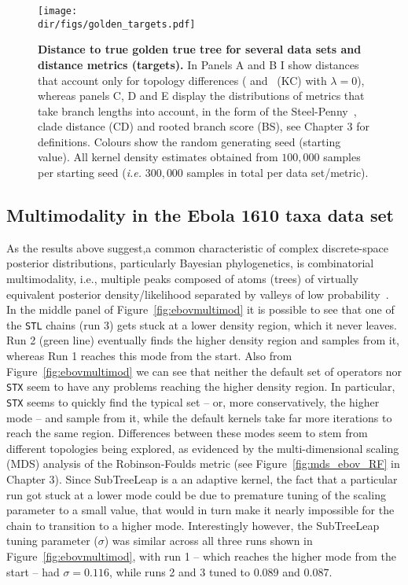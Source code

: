 \begin{figure}[!ht]
\begin{center}
\texttt{[image: \\dir/figs/golden\_targets.pdf]} 
\end{center}
 \caption[Distance to true golden true tree for several data sets and distance metrics (targets).]{\textbf{Distance to true golden true tree for several data sets and distance metrics (targets).}
 In Panels A and B I show distances that account only for topology differences (\cite{Robinson1981} and~\cite{Kendall2016} (KC) with $\lambda = 0$), whereas panels C, D and E display the distributions of metrics that take branch lengths into account, in the form of the Steel-Penny~\citep{Steel1993}, clade distance (CD) and rooted branch score (BS), see Chapter 3 for definitions.
 Colours show the random generating seed (starting value).
 All kernel density estimates obtained from $100, 000$ samples per starting seed (\textit{i.e.} $300, 000$ samples in total per data set/metric).
 }
 \label{fig:target_golden}
\end{figure}

\subsection{Multimodality in the Ebola 1610 taxa data set}
\label{sec:multimod}

As the results above suggest,a common characteristic of complex discrete-space posterior distributions, particularly Bayesian phylogenetics, is combinatorial multimodality, i.e., multiple peaks composed of atoms (trees) of virtually equivalent posterior density/likelihood separated by valleys of low probability~\citep{Lakner2008,Whidden2015}.
In the middle panel of Figure~\ref{fig:ebovmultimod} it is possible to see that one of the \verb|STL| chains (run 3) gets stuck at a lower density region, which it never leaves.
Run 2 (green line) eventually finds the higher density region and samples from it, whereas Run 1 reaches this mode from the start.
Also from Figure~\ref{fig:ebovmultimod} we can see that neither the default set of operators nor \verb|STX| seem to have any problems reaching the higher density region.
In particular, \verb|STX| seems to quickly find the typical set -- or, more conservatively, the higher mode -- and sample from it, while the default kernels take far more iterations to reach the same region.
Differences between these modes seem to stem from different topologies being explored, as evidenced by the multi-dimensional scaling (MDS) analysis of the Robinson-Foulds metric (see Figure~\ref{fig:mds_ebov_RF} in Chapter 3).
Since SubTreeLeap is a an adaptive kernel, the fact that a particular run got stuck at a lower mode could be due to premature tuning of the scaling parameter to a small value, that would in turn make it nearly impossible for the chain to transition to a higher mode.  
Interestingly however, the SubTreeLeap tuning parameter ($\sigma$) was similar across all three runs shown in Figure~\ref{fig:ebovmultimod}, with run 1 -- which reaches the higher mode from the start -- had $\sigma = 0.116$, while runs 2 and 3 tuned to $0.089$ and $0.087$.


